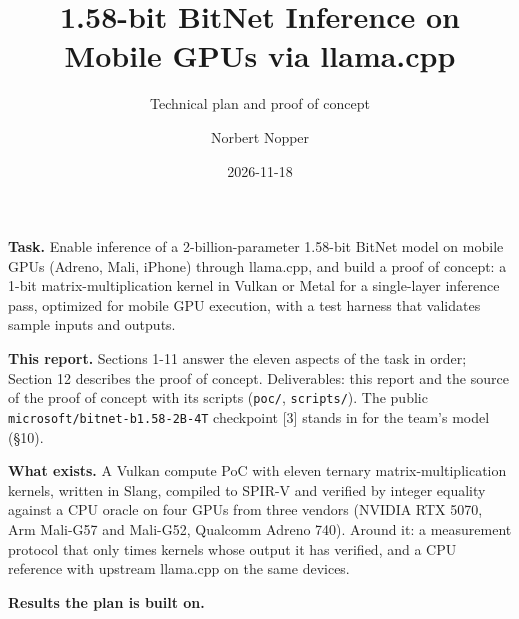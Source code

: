 \documentclass[
  10pt,
]{article}
\title{1.58-bit BitNet Inference on Mobile GPUs via llama.cpp}
\subtitle{Technical plan and proof of concept}
\author{Norbert Nopper}
\date{2026-11-18}
\begin{document}
\maketitle

\textbf{Task.} Enable inference of a 2-billion-parameter 1.58-bit BitNet
model on mobile GPUs (Adreno, Mali, iPhone) through llama.cpp, and build
a proof of concept: a 1-bit matrix-multiplication kernel in Vulkan or
Metal for a single-layer inference pass, optimized for mobile GPU
execution, with a test harness that validates sample inputs and outputs.

\textbf{This report.} Sections 1-11 answer the eleven aspects of the
task in order; Section 12 describes the proof of concept. Deliverables:
this report and the source of the proof of concept with its scripts
(\texttt{poc/}, \texttt{scripts/}). The public
\texttt{microsoft/bitnet-b1.58-2B-4T} checkpoint [3] stands in for
the team's model (\S{}10).

\textbf{What exists.} A Vulkan compute PoC with eleven ternary
matrix-multiplication kernels, written in Slang, compiled to SPIR-V and
verified by integer equality against a CPU oracle on four GPUs from
three vendors (NVIDIA RTX 5070, Arm Mali-G57 and Mali-G52, Qualcomm
Adreno 740). Around it: a measurement protocol that only times kernels
whose output it has verified, and a CPU reference with upstream
llama.cpp on the same devices.

\textbf{Results the plan is built on.}
\end{document}
